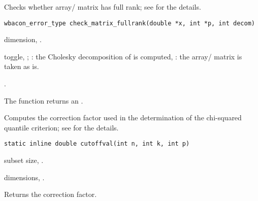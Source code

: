 \documentclass[a4paper,oneside,10pt,DIV=12]{scrreprt}
\begin{document}
\begin{Description}
Checks whether array/ matrix has full rank; see  for the
details.
\end{Description}
\begin{Usage}
\begin{verbatim}
wbacon_error_type check_matrix_fullrank(double *x, int *p, int decom)
\end{verbatim}
\end{Usage}
\begin{Arguments}
	\begin{ldescription}
		\item[\code{p}] dimension, \code{[int]}.
		\item[\code{decom}] toggle, \code{[int]}; : the Cholesky 
			decomposition of  is computed, : the array/ matrix
			 is taken as is.
	\end{ldescription}
\end{Arguments}
\begin{Dependency}
	\code{LAPACK::dpotrf}.
\end{Dependency}
\begin{Value}
The function returns an .
\end{Value}

\begin{Description}
Computes the correction factor used in the determination of the chi-squared
quantile criterion; see  for the details.
\end{Description}
\begin{Usage}
\begin{verbatim}
static inline double cutoffval(int n, int k, int p)
\end{verbatim}
\end{Usage}
\begin{Arguments}
	\begin{ldescription}
		\item[\code{k}] subset size, \code{[int]}.
		\item[\code{n, p}] dimensions, \code{[int]}.
	\end{ldescription}
\end{Arguments}
\begin{Value}
Returns the correction factor.
\end{Value}
\end{document}
